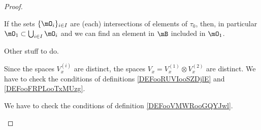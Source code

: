 \begin{proof}
\begin{subproof}
\begin{subproof}
			\spitem[Union]

			If the sets \( \{ \mO_i \}_{i\in I}\) are (each) intersections of elements of \( \tau_0\), then, in particular \( \mO_1\subset \bigcup_{i\in I}\mO_i\) and we can find an element in \( \mB\) included in \( \mO_1\).

		\end{subproof}
	\end{subproof}
	\begin{proofpart}
		Other stuff to do.
	\end{proofpart}
	Since the spaces \( V^{(i)}_x\) are distinct, the spaces \( V_x=V_x^{(1)}\otimes V_x^{(2)}\) are distinct.
	We have to check the conditions of definitions \ref{DEFooRUVIooSZDjlE} and \ref{DEFooFRPLooTxMUzg}.
	\begin{subproof}
		We have to check the conditions of definition \ref{DEFooVMWRooGQYJwl}.
		\begin{subproof}





\end{subproof}
\end{subproof}
\end{proof}
